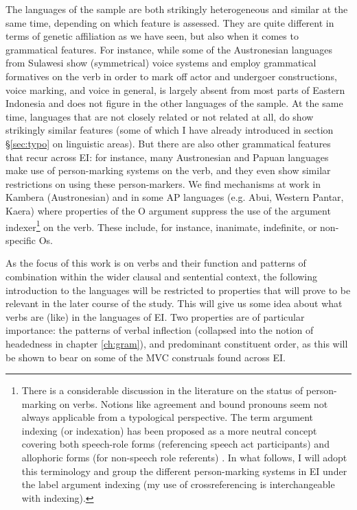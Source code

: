 The languages of the sample are both strikingly heterogeneous and similar at the same time, depending on which feature is assessed. They are quite different in terms of genetic affiliation as we have seen, but also when it comes to grammatical features. For instance, while some of the Austronesian languages from Sulawesi show (symmetrical) voice systems and employ grammatical formatives on the verb in order to mark off actor and undergoer constructions, voice marking, and voice in general, is largely absent from most parts of Eastern Indonesia and does not figure in the other languages of the sample. At the same time, languages that are not closely related or not related at all, do show strikingly similar features (some of which I have already introduced in section §\ref{sec:typo} on linguistic areas). But there are also other grammatical features that recur across EI: for instance, many Austronesian and Papuan languages make use of person-marking systems on the verb, and they even show similar restrictions on using these person-markers. We find mechanisms at work in Kambera (Austronesian) and in some AP languages (e.g. Abui, Western Pantar, Kaera) where properties of the O argument suppress the use of the argument indexer\footnote{There is a considerable discussion in the literature on the status of person-marking on verbs. Notions like agreement and bound pronouns seem not always applicable from a typological perspective. The term argument indexing (or indexation) has been proposed as a more neutral concept covering both speech-role forms (referencing speech act participants) and allophoric forms (for non-speech role referents) \parencite{haspelmath2013argument}. In what follows, I will adopt this terminology and group the different person-marking systems in EI under the label argument indexing (my use of crossreferencing is interchangeable with indexing).} on the verb. These include, for instance, inanimate, indefinite, or non-specific Os. 

As the focus of this work is on verbs and their function and patterns of combination within the wider clausal and sentential context, the following introduction to the languages will be restricted to properties that will prove to be relevant in the later course of the study. This will give us some idea about what verbs are (like) in the languages of EI. Two properties are of particular importance: the patterns of verbal inflection (collapsed into the notion of headedness in chapter \ref{ch:gram}), and predominant constituent order, as this will be shown to bear on some of the MVC construals found across EI.

